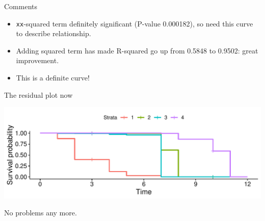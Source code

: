\begin{frame}[fragile]{Comments}
  
  \begin{itemize}
  \item \texttt{xx}-squared term definitely significant (P-value
    0.000182), so need this curve to describe relationship.
  \item Adding squared term has made R-squared go up from 0.5848 to
    0.9502: great improvement.
  \item This is a definite curve!
  \end{itemize}
  
\end{frame}


\begin{frame}[fragile]{The residual plot now}

  
 
\begin{knitrout}
\color{fgcolor}\begin{kframe}
\begin{alltt}
\hlstd{(}\hlopt{+}\hlstd{()}
\end{alltt}
\end{kframe}
\includegraphics[width=\maxwidth]{figure/unnamed-chunk-12-1} 

\end{knitrout}


No problems any more.  

\end{frame}

